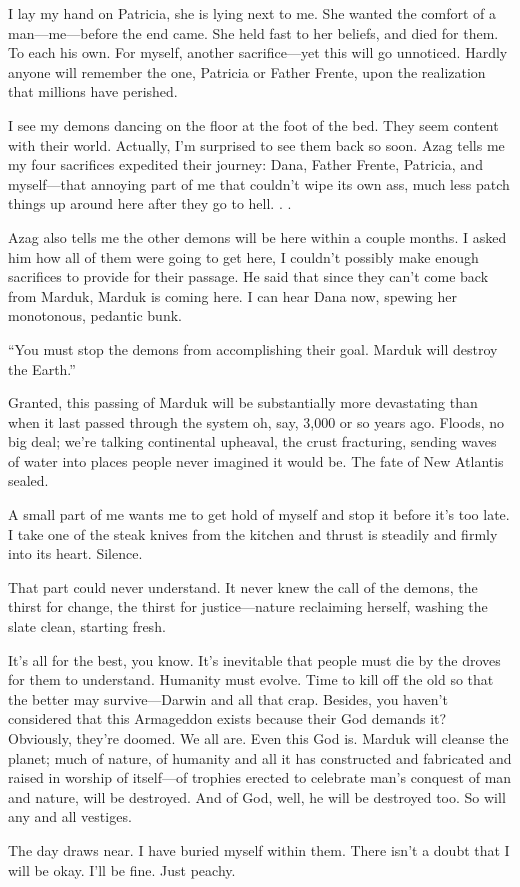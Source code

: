 \documentclass[
]{article}
\begin{document}
I lay my hand on Patricia, she is lying next to me. She wanted the
comfort of a man---me---before the end came. She held fast to her
beliefs, and died for them. To each his own. For myself, another
sacrifice---yet this will go unnoticed. Hardly anyone will remember the
one, Patricia or Father Frente, upon the realization that millions have
perished.

I see my demons dancing on the floor at the foot of the bed. They seem
content with their world. Actually, I'm surprised to see them back so
soon. Azag tells me my four sacrifices expedited their journey: Dana,
Father Frente, Patricia, and myself---that annoying part of me that
couldn't wipe its own ass, much less patch things up around here after
they go to hell. . .

Azag also tells me the other demons will be here within a couple months.
I asked him how all of them were going to get here, I couldn't possibly
make enough sacrifices to provide for their passage. He said that since
they can't come back from Marduk, Marduk is coming here. I can hear Dana
now, spewing her monotonous, pedantic bunk.

``You must stop the demons from accomplishing their goal. Marduk will
destroy the Earth.''

Granted, this passing of Marduk will be substantially more devastating
than when it last passed through the system oh, say, 3,000 or so years
ago. Floods, no big deal; we're talking continental upheaval, the crust
fracturing, sending waves of water into places people never imagined it
would be. The fate of New Atlantis sealed.

A small part of me wants me to get hold of myself and stop it before
it's too late. I take one of the steak knives from the kitchen and
thrust is steadily and firmly into its heart. Silence.

That part could never understand. It never knew the call of the demons,
the thirst for change, the thirst for justice---nature reclaiming
herself, washing the slate clean, starting fresh.

It's all for the best, you know. It's inevitable that people must die by
the droves for them to understand. Humanity must evolve. Time to kill
off the old so that the better may survive---Darwin and all that crap.
Besides, you haven't considered that this Armageddon exists because
their God demands it? Obviously, they're doomed. We all are. Even this
God is. Marduk will cleanse the planet; much of nature, of humanity and
all it has constructed and fabricated and raised in worship of
itself---of trophies erected to celebrate man's conquest of man and
nature, will be destroyed. And of God, well, he will be destroyed too.
So will any and all vestiges.

The day draws near. I have buried myself within them. There isn't a
doubt that I will be okay. I'll be fine. Just peachy.
\end{document}
